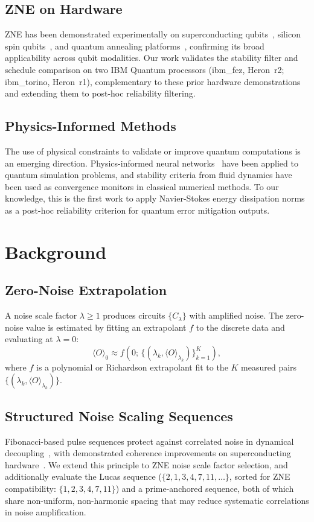 \documentclass[10pt,letterpaper]{article}
\begin{document}
\subsection{ZNE on Hardware}
ZNE has been demonstrated experimentally on superconducting
qubits~\cite{Zhang2025}, silicon spin qubits~\cite{Sohn2025}, and
quantum annealing platforms~\cite{Raymond2025}, confirming its broad
applicability across qubit modalities. Our work validates the
stability filter and schedule comparison on two IBM Quantum processors
(ibm\_fez, Heron~r2; ibm\_torino, Heron~r1), complementary to
these prior hardware demonstrations and extending them to
post-hoc reliability filtering.

\subsection{Physics-Informed Methods}
The use of physical constraints to validate or improve quantum
computations is an emerging direction. Physics-informed neural
networks~\cite{Raissi2019} have been applied to quantum simulation
problems, and stability criteria from fluid dynamics have been used as
convergence monitors in classical numerical methods. To our knowledge,
this is the first work to apply Navier-Stokes energy dissipation norms
as a post-hoc reliability criterion for quantum error mitigation outputs.

\section{Background}

\subsection{Zero-Noise Extrapolation}
A noise scale factor $\lambda\geq 1$ produces circuits $\{C_\lambda\}$
with amplified noise. The zero-noise value is estimated by fitting an
extrapolant $f$ to the discrete data and evaluating at $\lambda=0$:
\begin{equation}
  \langle O\rangle_0 \approx
    f\!\left(0;\,\bigl\{(\lambda_k,\langle O\rangle_{\lambda_k})\bigr\}_{k=1}^{K}\right),
\end{equation}
where $f$ is a polynomial or Richardson extrapolant fit to the $K$
measured pairs $\{(\lambda_k,\langle O\rangle_{\lambda_k})\}$.

\subsection{Structured Noise Scaling Sequences}
Fibonacci-based pulse sequences protect against correlated noise in
dynamical decoupling~\cite{Viola1998}, with demonstrated coherence
improvements on superconducting hardware~\cite{Google2023}. We extend
this principle to ZNE noise scale factor selection, and additionally
evaluate the Lucas sequence ($\{2,1,3,4,7,11,\ldots\}$, sorted for
ZNE compatibility: $\{1,2,3,4,7,11\}$) and a prime-anchored sequence, 
both of which share non-uniform, non-harmonic spacing that may reduce 
systematic correlations in noise amplification.
\end{document}
